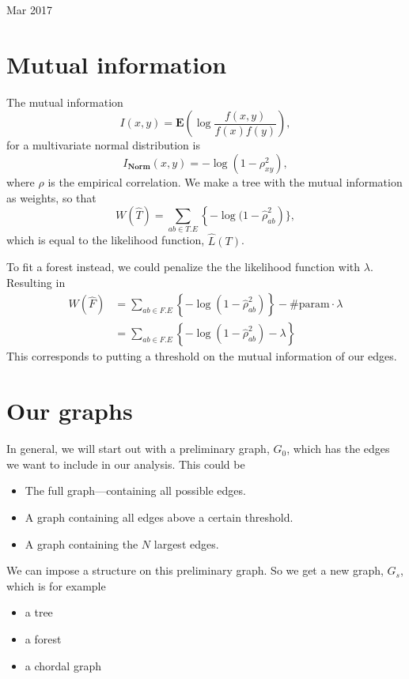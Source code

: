 \documentclass[12pt]{article}
\newcommand{\E}{\textbf{E}}
\newcommand{\N}{\textbf{Norm}}
\begin{document}
{\Large Mar 2017}
\section{Mutual information}
The mutual information
$$ I(x,y) = \E \left(\log \frac{ f(x,y) }{ f(x) f(y) }\right), $$
for a multivariate normal distribution is 
$$ I_\N(x,y) = - \log( 1 - \rho_{xy}^2),$$
where $\rho$ is the empirical correlation. We make a tree with the mutual information as weights, so that 
$$ W(\hat T) = \sum_{ab\in T.E} \left\{ - \log(1 - \hat\rho_{ab}^2 \right)\},$$
which is equal to the likelihood function, $\hat L(T)$. 

To fit a forest instead, we could penalize the the likelihood function with $\lambda$. Resulting in 
\begin{align}
W(\hat F) &= \sum_{ab\in F.E} \left\{ - \log(1 - \hat\rho_{ab}^2) \right\} - \mathrm{\# param}\cdot \lambda \\
&= \sum_{ab\in F.E} \left\{ - \log(1 - \hat\rho_{ab}^2) - \lambda \right\} 
\end{align}
This corresponds to putting a threshold on the mutual information of our edges.

\section{Our graphs}
In general, we will start out with a preliminary graph, $G_0$, which has the 
edges we want to include in our analysis. This could be 

\begin{itemize}
\item The full graph---containing all possible edges.
\item A graph containing all edges above a certain threshold.
\item A graph containing the $N$ largest edges.
\end{itemize}

We can impose a structure on this preliminary graph. So we get a new graph, $G_s$, which is for example

\begin{itemize}
\item a tree
\item a forest
\item a chordal graph
\end{itemize}
\end{document}
